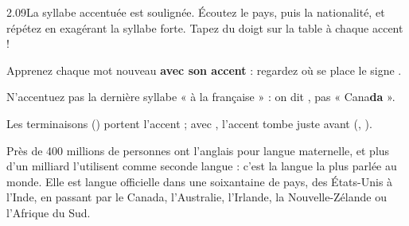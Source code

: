 \begin{paires}{2.09}{La syllabe accentuée est soulignée. Écoutez le pays, puis la nationalité, et
répétez en exagérant la syllabe forte. Tapez du doigt sur la table à chaque accent !}
\end{paires}

\begin{astuce}
\begin{etapes}
\item Apprenez chaque mot nouveau \textbf{avec son accent} : regardez où se place le signe .
\item N'accentuez pas la dernière syllabe « à la française » : on dit , pas
  « Cana\textbf{da} ».
\item Les terminaisons  () portent l'accent ; avec ,
  l'accent tombe juste avant (, ).
\end{etapes}
\end{astuce}


\begin{culture}
Près de 400 millions de personnes ont l'anglais pour langue maternelle, et plus d'un milliard
l'utilisent comme seconde langue : c'est la langue la plus parlée au monde. Elle est langue
officielle dans une soixantaine de pays, des États-Unis à l'Inde, en passant par le Canada,
l'Australie, l'Irlande, la Nouvelle-Zélande ou l'Afrique du Sud.
\end{culture}


